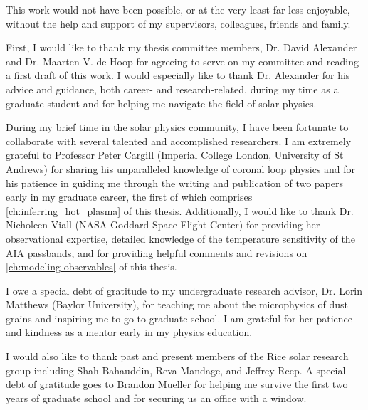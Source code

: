 
\begin{acknowledgements}      

This work would not have been possible, or at the very least far less enjoyable, without the help and support of my supervisors, colleagues, friends and family. 

First, I would like to thank my thesis committee members, Dr. David Alexander and Dr. Maarten V. de Hoop for agreeing to serve on my committee and reading a first draft of this work. I would especially like to thank Dr. Alexander for his advice and guidance, both career- and research-related, during my time as a graduate student and for helping me navigate the field of solar physics.

During my brief time in the solar physics community, I have been fortunate to collaborate with several talented and accomplished researchers. I am extremely grateful to Professor Peter Cargill (Imperial College London, University of St Andrews) for sharing his unparalleled knowledge of coronal loop physics and for his patience in guiding me through the writing and publication of two papers early in my graduate career, the first of which comprises \autoref{ch:inferring_hot_plasma} of this thesis. Additionally, I would like to thank Dr. Nicholeen Viall (NASA Goddard Space Flight Center) for providing her observational expertise, detailed knowledge of the temperature sensitivity of the AIA passbands, and for providing helpful comments and revisions on \autoref{ch:modeling-observables} of this thesis.

I owe a special debt of gratitude to my undergraduate research advisor, Dr. Lorin Matthews (Baylor University), for teaching me about the microphysics of dust grains and inspiring me to go to graduate school. I am grateful for her patience and kindness as a mentor early in my physics education.


I would also like to thank past and present members of the Rice solar research group including Shah Bahauddin, Reva Mandage, and Jeffrey Reep. A special debt of gratitude goes to Brandon Mueller for helping me survive the first two years of graduate school and for securing us an office with a window.



\end{acknowledgements}
